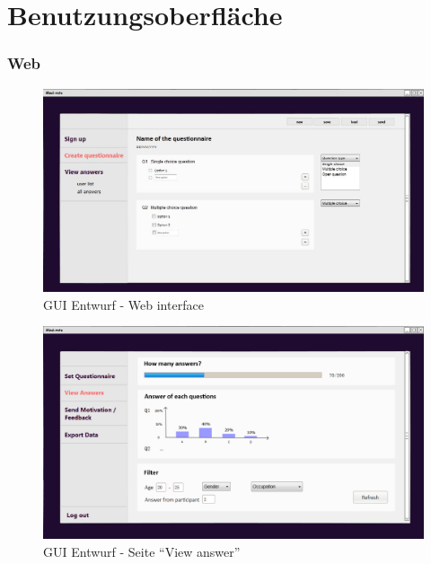 \documentclass[a4paper]{scrreprt}
\begin{document}
    \chapter{Benutzungsoberfläche}
        \subsection{Web}
            \begin{figure}[ht]
                \centering
                \includegraphics[scale = 0.4]{web.jpg}
                \caption{GUI Entwurf - Web interface}
            \end{figure}

            \begin{figure}[ht]
                \centering
                \includegraphics[scale=0.25]{web_ViewAnswer.png}
                \caption{GUI Entwurf - Seite ``View answer''}
                \label{web_ViewAnswer}
            \end{figure}
	
\end{document}
